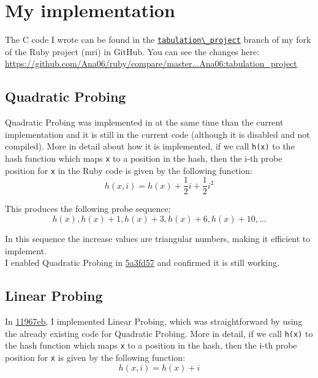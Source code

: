 \documentclass[oneside, 12pt]{article}
\theoremstyle{break}
\newcommand{\commitLinearShort}{11967eb}
\newcommand{\commitLinear}{11967ebf6e66d794d3efcb388b0e23cac045fc3e}
\newcommand{\commitQuadraticShort}{5a3fd57}
\newcommand{\commitQuadratic}{5a3fd57c3beeb86575cfeeb3d0dd458e5c016826}
\newcommand{\commitUrl}[2]{\href{https://github.com/Ana06/ruby/commit/#1}{#2}}
\begin{document}
\section{My implementation}

The C code I wrote can be found in the \href{https://github.com/Ana06/ruby/tree/tabulation_project}{\lstinline{tabulation\_project}} branch of my fork of the Ruby project (\acrshort{mri}) in GitHub.
You can see the changes here:\\
\url{https://github.com/Ana06/ruby/compare/master...Ana06:tabulation_project}\\

\subsection{Quadratic Probing}

Quadratic Probing was implemented in \cite{ruby_code} at the same time than the current implementation and it is still in the current code (although it is disabled and not compiled).
More in detail about how it is implemented, if we call \lstinline{h(x)} to the hash function which maps \lstinline{x} to a position in the hash, then the i-th probe position for \lstinline{x} in the Ruby code is given by the following function:\\
\[h(x,i) = h(x) + \frac{1}{2}i + \frac{1}{2}i^2\]

\vspace{3mm}

This produces the following probe sequence:\\
\[h(x), h(x) + 1, h(x) + 3, h(x) + 6, h(x) + 10, \dots \]

\vspace{2mm}

In this sequence the increase values are triangular numbers, making it efficient to implement.\\

I enabled Quadratic Probing in \commitUrl{\commitQuadratic}{\commitQuadraticShort} and confirmed it is still working.\\

\subsection{Linear Probing}

In \commitUrl{\commitLinear}{\commitLinearShort}, I implemented Linear Probing, which was straightforward by using the already existing code for Quadratic Probing.
More in detail, if we call \lstinline{h(x)} to the hash function which maps \lstinline{x} to a position in the hash, then the i-th probe position for \lstinline{x} is given by the following function:\\
\[h(x,i) = h(x) + i\]
\end{document}
